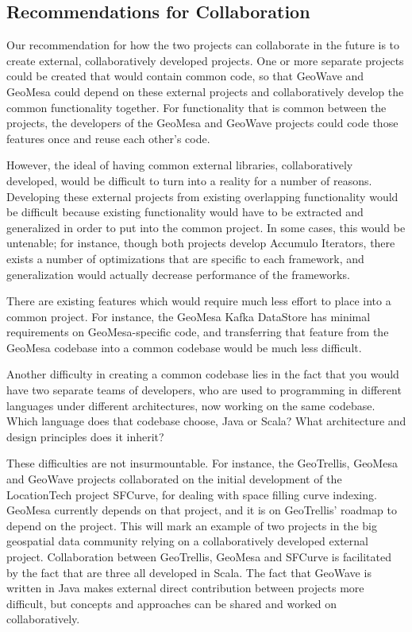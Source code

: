 \subsection{Recommendations for Collaboration}
\label{sec:conclusions:collaboration}

Our recommendation for how the two projects can collaborate in the future is to create external, collaboratively developed projects.
One or more separate projects could be created that would contain common code, so that GeoWave and GeoMesa could depend on these external projects and collaboratively develop the common functionality together.
For functionality that is common between the projects, the developers of the GeoMesa and GeoWave projects could code those features once and reuse each other's code.

However, the ideal of having common external libraries, collaboratively developed, would be difficult to turn into a reality for a number of reasons.
Developing these external projects from existing overlapping functionality would be difficult because existing functionality would have to be extracted and generalized in order to put into the common project.
In some cases, this would be untenable; for instance, though both projects develop Accumulo Iterators, there exists a number of optimizations that are specific to each framework, and generalization would actually decrease performance of the frameworks.

There are existing features which would require much less effort to place into a common project.
For instance, the GeoMesa Kafka DataStore has minimal requirements on GeoMesa-specific code, and transferring that feature from the GeoMesa codebase into a common codebase would be much less difficult.

Another difficulty in creating a common codebase lies in the fact that you would have two separate teams of developers, who are used to programming in different languages under different architectures, now working on the same codebase.
Which language does that codebase choose, Java or Scala? What architecture and design principles does it inherit?

These difficulties are not insurmountable.
For instance, the GeoTrellis, GeoMesa and GeoWave projects collaborated on the initial development of the LocationTech project SFCurve, for dealing with space filling curve indexing.
GeoMesa currently depends on that project, and it is on GeoTrellis' roadmap to depend on the project.
This will mark an example of two projects in the big geospatial data community relying on a collaboratively developed external project.
Collaboration between GeoTrellis, GeoMesa and SFCurve is facilitated by the fact that are three all developed in Scala.
The fact that GeoWave is written in Java makes external direct contribution between projects more difficult, but concepts and approaches can be shared and worked on collaboratively.

